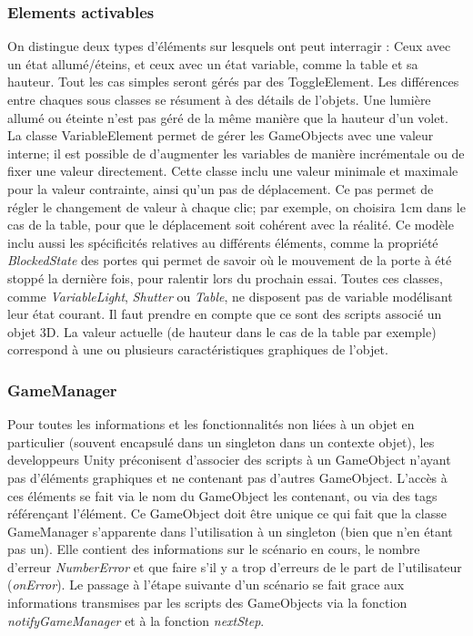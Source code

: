 \subsubsection{Elements activables}
On distingue deux types d'éléments sur lesquels ont peut interragir : Ceux avec un état allumé/éteins, et ceux avec un état variable, comme la table et sa hauteur.
Tout les cas simples seront gérés par des ToggleElement. Les différences entre chaques sous classes se résument à des détails de l'objets.
Une lumière allumé ou éteinte n'est pas géré de la même manière que la hauteur d'un volet.
La classe VariableElement permet de gérer les GameObjects avec une valeur interne; il est possible de d'augmenter les variables de manière incrémentale ou de fixer une valeur directement.
Cette classe inclu une valeur minimale et maximale pour la valeur contrainte, ainsi qu'un pas de déplacement.
Ce pas permet de régler le changement de valeur à chaque clic; par exemple, on choisira 1cm dans le cas de la table, pour que le déplacement soit cohérent avec la réalité.
Ce modèle inclu aussi les spécificités relatives au différents éléments, comme la propriété \textit{BlockedState} des portes qui permet de savoir où le mouvement de la porte à été stoppé la dernière fois, pour ralentir lors du prochain essai.
\newline
Toutes ces classes, comme \textit{VariableLight}, \textit{Shutter} ou \textit{Table},  ne disposent pas de variable modélisant leur état courant. 
Il faut prendre en compte que ce sont des scripts associé un objet 3D. 
La valeur actuelle (de hauteur dans le cas de la table par exemple) correspond à une ou plusieurs caractéristiques graphiques de l'objet.

\subsubsection{GameManager}
Pour toutes les informations et les fonctionnalités non liées à un objet en particulier (souvent encapsulé dans un singleton dans un contexte objet), les developpeurs Unity préconisent d'associer des scripts à un GameObject n'ayant pas d'éléments graphiques et ne contenant pas d'autres GameObject.
L'accès à ces éléments se fait via le nom du GameObject les contenant, ou via des tags référençant l'élément. Ce GameObject doit être unique ce qui fait que la classe GameManager s'apparente dans l'utilisation à un singleton (bien que n'en étant pas un). 
Elle contient des informations sur le scénario en cours, le nombre d'erreur \textit{NumberError} et que faire s'il y a trop d'erreurs de le part de l'utilisateur (\textit{onError}).
Le passage à l'étape suivante d'un scénario se fait grace aux informations transmises par les scripts des GameObjects via la fonction \textit{notifyGameManager} et à la fonction \textit{nextStep}.
